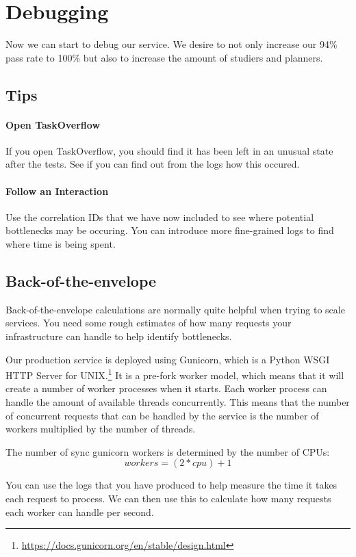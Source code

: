 \documentclass{csse4400}
\begin{document}
\section{Debugging}

Now we can start to debug our service.
We desire to not only increase our 94\% pass rate to 100\% but also to increase the amount of studiers and planners.

\subsection{Tips}

\paragraph{Open TaskOverflow}
If you open TaskOverflow,
you should find it has been left in an unusual state after the tests.
See if you can find out from the logs how this occured.

\paragraph{Follow an Interaction}
Use the correlation IDs that we have now included to see where potential bottlenecks may be occuring.
You can introduce more fine-grained logs to find where time is being spent.

\subsection{Back-of-the-envelope}
Back-of-the-envelope calculations are normally quite helpful when trying to scale services.
You need some rough estimates of how many requests your infrastructure can handle to help identify bottlenecks.

Our production service is deployed using Gunicorn,
which is a Python WSGI HTTP Server for UNIX.\footnote{\url{https://docs.gunicorn.org/en/stable/design.html}}
It is a pre-fork worker model,
which means that it will create a number of worker processes when it starts.
Each worker process can handle the amount of available threads concurrently.
This means that the number of concurrent requests that can be handled by the service is the number of workers multiplied by the number of threads.

The number of sync gunicorn workers is determined by the number of CPUs:
$$
workers = (2 * cpu) + 1
$$

You can use the logs that you have produced to help measure the time it takes each request to process.
We can then use this to calculate how many requests each worker can handle per second.
\end{document}
